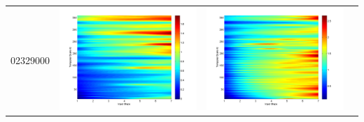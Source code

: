 \documentclass[11pt]{article}
\begin{document}
\begin{table}[H]
{\begin{tabular}{c  c   c   c  }
02329000&\begin{minipage}{.3\textwidth}\includegraphics[width=\linewidth]{resultgraph/02329000p.png}\end{minipage}
&\begin{minipage}{.3\textwidth}\includegraphics[width=\linewidth]{resultgraph/02329000pep.png}\end{minipage}

\end{tabular}}
\end{table}
\end{document}
